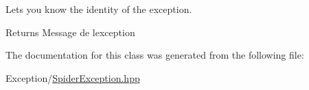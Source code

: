 Lets you know the identity of the exception. 

\begin{DoxyReturn}{Returns}
Message de l\textquotesingle{}exception 
\end{DoxyReturn}


The documentation for this class was generated from the following file\+:\begin{DoxyCompactItemize}
\item 
Exception/\hyperlink{_spider_exception_8hpp}{Spider\+Exception.\+hpp}\end{DoxyCompactItemize}

